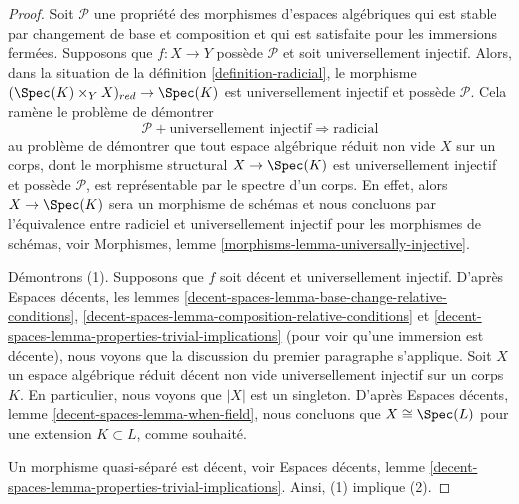 \begin{proof}
Soit $\mathcal{P}$ une propriété des morphismes d'espaces algébriques
qui est stable par changement de base et composition et qui est satisfaite pour
les immersions fermées. Supposons que $f : X \to Y$ possède $\mathcal{P}$ et
soit universellement injectif. Alors, dans la situation de la
définition \ref{definition-radicial},
le morphisme $(\Spec(K) \times_Y X)_{red} \to \Spec(K)$
est universellement injectif et possède $\mathcal{P}$. Cela ramène le
problème de démontrer
$$
\mathcal{P} + \text{universellement injectif}
\Rightarrow
\text{radicial}
$$
au problème de démontrer que tout espace algébrique réduit non vide $X$
sur un corps, dont le morphisme structural $X \to \Spec(K)$ est universellement
injectif et possède $\mathcal{P}$, est représentable par le spectre d'un corps.
En effet, alors $X \to \Spec(K)$ sera un morphisme de schémas et
nous concluons par l'équivalence entre radiciel et universellement injectif pour
les morphismes de schémas, voir
Morphismes, lemme \ref{morphisms-lemma-universally-injective}.

\medskip\noindent
Démontrons (1). Supposons que $f$ soit décent et universellement injectif. D'après
Espaces décents,
les lemmes \ref{decent-spaces-lemma-base-change-relative-conditions},
\ref{decent-spaces-lemma-composition-relative-conditions} et
\ref{decent-spaces-lemma-properties-trivial-implications}
(pour voir qu'une immersion est décente), nous voyons que la discussion du
premier paragraphe s'applique.
Soit $X$ un espace algébrique réduit décent non vide
universellement injectif sur un corps $K$. En particulier, nous voyons que $|X|$
est un singleton. D'après
Espaces décents, lemme \ref{decent-spaces-lemma-when-field},
nous concluons que $X \cong \Spec(L)$ pour une extension
$K \subset L$, comme souhaité.

\medskip\noindent
Un morphisme quasi-séparé est décent, voir
Espaces décents,
lemme \ref{decent-spaces-lemma-properties-trivial-implications}.
Ainsi, (1) implique (2).


\end{proof}

